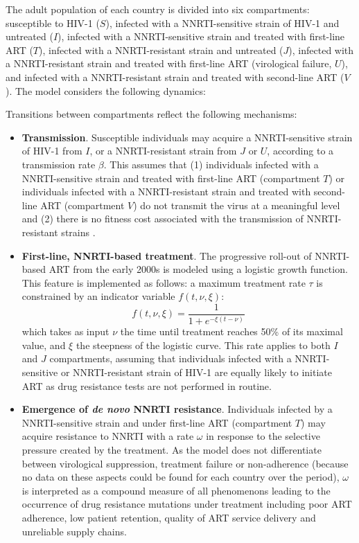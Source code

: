 \documentclass{article}
\begin{document}
	The adult population of each country is divided into six compartments: susceptible to HIV-1 ($S$), infected with a NNRTI-sensitive strain of HIV-1 and untreated ($I$), infected with a NNRTI-sensitive strain and treated with first-line ART ($T$), infected with a NNRTI-resistant strain and untreated ($J$), infected with a NNRTI-resistant strain and treated with first-line ART (virological failure, $U$), and infected with a NNRTI-resistant strain and treated with second-line ART ($V$).
	The model considers the following dynamics:
	
	Transitions between compartments reflect the following mechanisms:
	\begin{itemize}
		\item \textbf{Transmission}. 
		Susceptible individuals may acquire a NNRTI-sensitive strain of HIV-1 from $I$, or a NNRTI-resistant strain from $J$ or $U$, according to a transmission rate $\beta$.
		This assumes that (1) individuals infected with a NNRTI-sensitive strain and treated with first-line ART (compartment $T$) or individuals infected with a NNRTI-resistant strain and treated with second-line ART (compartment $V$) do not transmit the virus at a meaningful level\cite{supervie2014heterosexual} and (2) there is no fitness cost associated with the transmission of NNRTI-resistant strains \cite{little2008persistence}.
		
		\item \textbf{First-line, NNRTI-based treatment}. 
		The progressive roll-out of NNRTI-based ART from the early 2000s is modeled using a logistic growth function.
		This feature is implemented as follows: a maximum treatment rate $\tau$ is constrained by an indicator variable $f(t,\nu,\xi)$:
		\begin{equation}
		f(t,\nu,\xi) = \frac{1}{1+e^{-\xi (t-\nu)}} 
		\end{equation}
		which takes as input $\nu$ the time until treatment reaches 50\% of its maximal value, and $\xi$ the steepness of the logistic curve.
		This rate applies to both $I$ and $J$ compartments, assuming that individuals infected with a NNRTI-sensitive or NNRTI-resistant strain of HIV-1 are equally likely to initiate ART as drug resistance tests are not performed in routine.
		
		\item \textbf{Emergence of \emph{de novo} NNRTI resistance}. 
		Individuals infected by a NNRTI-sensitive strain and under first-line ART (compartment $T$) may acquire resistance to NNRTI with a rate $\omega$ in response to the selective pressure created by the treatment.
		As the model does not differentiate between virological suppression, treatment failure or non-adherence (because no data on these aspects could be found for each country over the period), $\omega$ is interpreted as a compound measure of all phenomenons leading to the occurrence of drug resistance mutations under treatment including poor ART adherence, low patient retention, quality of ART service delivery and unreliable supply chains. 
		

\end{itemize}
\end{document}
